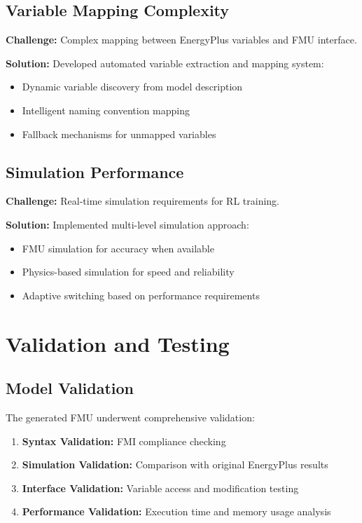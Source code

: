 \documentclass[12pt,a4paper]{article}
\begin{document}
{\subsection{Variable Mapping Complexity}

\textbf{Challenge:} Complex mapping between EnergyPlus variables and FMU interface.

\textbf{Solution:} Developed automated variable extraction and mapping system:
\begin{itemize}
    \item Dynamic variable discovery from model description
    \item Intelligent naming convention mapping
    \item Fallback mechanisms for unmapped variables
\end{itemize}

\subsection{Simulation Performance}

\textbf{Challenge:} Real-time simulation requirements for RL training.

\textbf{Solution:} Implemented multi-level simulation approach:
\begin{itemize}
    \item FMU simulation for accuracy when available
    \item Physics-based simulation for speed and reliability
    \item Adaptive switching based on performance requirements
\end{itemize}

\section{Validation and Testing}

\subsection{Model Validation}

The generated FMU underwent comprehensive validation:

\begin{enumerate}
    \item \textbf{Syntax Validation:} FMI compliance checking
    \item \textbf{Simulation Validation:} Comparison with original EnergyPlus results
    \item \textbf{Interface Validation:} Variable access and modification testing
    \item \textbf{Performance Validation:} Execution time and memory usage analysis
\end{enumerate}

}
\end{document}
